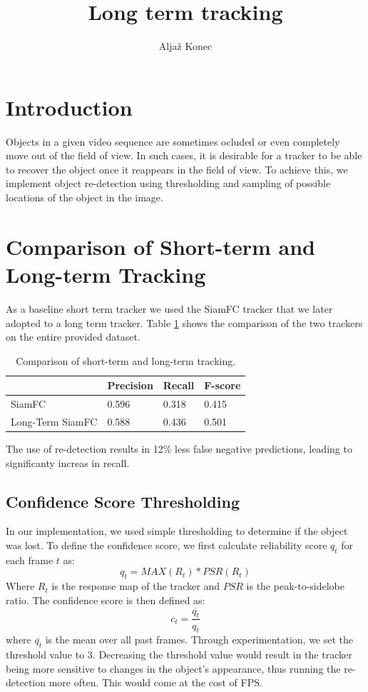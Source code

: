 \documentclass[9pt]{IEEEtran}
\title{\vspace{0ex}
Long term tracking}
\author{Aljaž Konec\vspace{-4.0ex}}
\begin{document}
\maketitle

\section{Introduction}

Objects in a given video sequence are sometimes ocluded or even completely move out of the field of view.
In such cases, it is desirable for a tracker to be able to recover the object once it reappears in the field of view.
To achieve this, we implement object re-detection using thresholding and sampling of possible locations of the object in the image.

\section{Comparison of Short-term and Long-term Tracking}

As a baseline short term tracker we used the SiamFC tracker that we later adopted to a long term tracker.
Table \ref{tab:short_vs_long} shows the comparison of the two trackers on the entire provided dataset.
\begin{table}[!ht]
    \centering
    \begin{tabular}{llll}
        \textbf{} & \textbf{Precision} & \textbf{Recall} & \textbf{F-score} \\ \hline
        SiamFC & 0.596 & 0.318 & 0.415 \\ 
        Long-Term SiamFC & 0.588 & 0.436 & 0.501 \\ 
    \end{tabular}
    \caption{Comparison of short-term and long-term tracking.}
    \label{tab:short_vs_long}
\end{table}
The use of re-detection results in 12\% less false negative predictions, leading to significanty increas in recall.

\subsection*{Confidence Score Thresholding}
In our implementation, we used simple thresholding to determine if the object was lost.
To define the confidence score, we first calculate reliability score $q_t$ for each frame $t$ as:
\begin{equation}
    q_t = MAX(R_t) * PSR(R_t)
\end{equation}
Where $R_t$ is the response map of the tracker and $PSR$ is the peak-to-sidelobe ratio.
The confidence score is then defined as:
\begin{equation}
    c_t = \frac{\overline{q_t} }{q_t}
\end{equation}
where $\overline{q_t}$ is the mean over all past frames.
Through experimentation, we set the threshold value to 3.
Decreasing the threshold value would result in the tracker being more sensitive to changes in the object's appearance, thus running the re-detection more often.
This would come at the cost of FPS.
\end{document}

